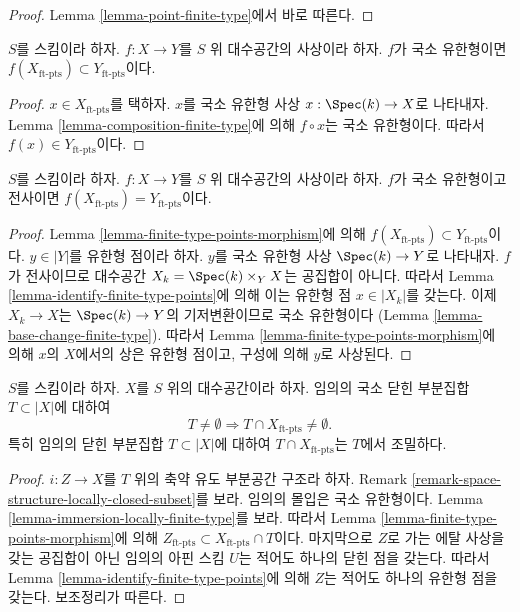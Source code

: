 \begin{proof}
Lemma \ref{lemma-point-finite-type}에서 바로 따른다.
\end{proof}

\begin{lemma}
\label{lemma-finite-type-points-morphism}
$S$를 스킴이라 하자.
$f : X \to Y$를 $S$ 위 대수공간의 사상이라 하자.
$f$가 국소 유한형이면
$f(X_{\text{ft-pts}}) \subset Y_{\text{ft-pts}}$이다.
\end{lemma}

\begin{proof}
$x \in X_{\text{ft-pts}}$를 택하자. $x$를 국소 유한형 사상
$x : \Spec(k) \to X$로 나타내자. Lemma
\ref{lemma-composition-finite-type}에 의해 $f \circ x$는 국소 유한형이다.
따라서 $f(x) \in Y_{\text{ft-pts}}$이다.
\end{proof}

\begin{lemma}
\label{lemma-finite-type-points-surjective-morphism}
$S$를 스킴이라 하자.
$f : X \to Y$를 $S$ 위 대수공간의 사상이라 하자.
$f$가 국소 유한형이고 전사이면
$f(X_{\text{ft-pts}}) = Y_{\text{ft-pts}}$이다.
\end{lemma}

\begin{proof}
Lemma \ref{lemma-finite-type-points-morphism}에 의해
$f(X_{\text{ft-pts}}) \subset Y_{\text{ft-pts}}$이다.
$y \in |Y|$를 유한형 점이라 하자. $y$를 국소 유한형 사상
$\Spec(k) \to Y$로 나타내자. $f$가 전사이므로 대수공간
$X_k = \Spec(k) \times_Y X$는 공집합이 아니다. 따라서 Lemma
\ref{lemma-identify-finite-type-points}에 의해 이는 유한형 점
$x \in |X_k|$를 갖는다. 이제 $X_k \to X$는
$\Spec(k) \to Y$의 기저변환이므로 국소 유한형이다
(Lemma \ref{lemma-base-change-finite-type}).
따라서 Lemma \ref{lemma-finite-type-points-morphism}에 의해
$x$의 $X$에서의 상은 유한형 점이고, 구성에 의해 $y$로 사상된다.
\end{proof}

\begin{lemma}
\label{lemma-enough-finite-type-points}
$S$를 스킴이라 하자. $X$를 $S$ 위의 대수공간이라 하자.
임의의 국소 닫힌 부분집합 $T \subset |X|$에 대하여
$$
T \not = \emptyset
\Rightarrow
T \cap X_{\text{ft-pts}} \not = \emptyset.
$$
특히 임의의 닫힌 부분집합 $T \subset |X|$에 대하여
$T \cap X_{\text{ft-pts}}$는 $T$에서 조밀하다.
\end{lemma}

\begin{proof}
$i : Z \to X$를 $T$ 위의 축약 유도 부분공간 구조라 하자.
Remark \ref{remark-space-structure-locally-closed-subset}를 보라.
임의의 몰입은 국소 유한형이다. Lemma
\ref{lemma-immersion-locally-finite-type}를 보라.
따라서 Lemma \ref{lemma-finite-type-points-morphism}에 의해
$Z_{\text{ft-pts}} \subset X_{\text{ft-pts}} \cap T$이다.
마지막으로 $Z$로 가는 에탈 사상을 갖는 공집합이 아닌 임의의 아핀 스킴
$U$는 적어도 하나의 닫힌 점을 갖는다. 따라서 Lemma
\ref{lemma-identify-finite-type-points}에 의해 $Z$는 적어도 하나의
유한형 점을 갖는다. 보조정리가 따른다.
\end{proof}

